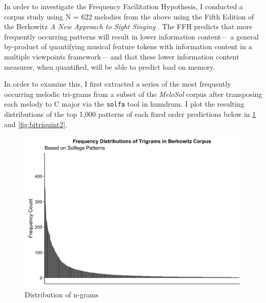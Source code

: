 \documentclass[12pt,]{book}
\begin{document}
In order to investigate the Frequency Facilitation Hypothesis, I conducted a corpus study using N = 622 melodies from the above using the Fifth Edition of the Berkowitz \emph{A New Approach to Sight Singing} \citep{berkowitzNewApproachSight2011}.
The FFH predicts that more frequently occurring patterns will result in lower information content--- a general by-product of quantifying musical feature tokens with information content in a multiple viewpoints framework--- and that these lower information content measures, when quantified, will be able to predict load on memory.

In order to examine this, I first extracted a series of the most frequently occurring melodic tri-grams from a subset of the \emph{MeloSol} corpus after transposing each melody to C major via the \texttt{solfa} tool in humdrum.
I plot the resulting distributions of the top 1,000 patterns of each fixed order predictions below in \ref{fig:bitriquint} and \ref{fig:bitriquint2}.

\begin{figure}

{\centering \includegraphics[width=1\linewidth]{img/trigrams} 

}

\caption{Distribution of n-grams}\label{fig:bitriquint}
\end{figure}
\end{document}
